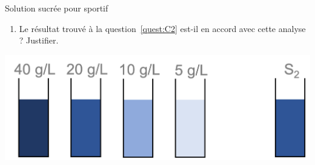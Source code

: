 \documentclass[12pt,a4paper]{article}
\begin{document}
\begin{exo}{Solution sucrée pour sportif}
\begin{enumerate}[resume]
\item \anarai{}  \val{} 

Le résultat trouvé à la question~\ref{quest:C2} est-il en accord avec cette analyse ?
Justifier.
\end{enumerate}

\begin{center}
\includegraphics[scale=0.5]{images/echelle_teinte_isotonique.png}
\end{center}

\end{exo}

\newpage
\end{document}
